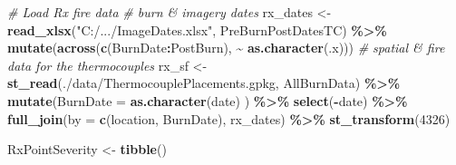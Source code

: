 \documentclass[
]{article}
\newenvironment{Shaded}{\begin{snugshade}}{\end{snugshade}}
\newcommand{\AttributeTok}[1]{\textcolor[rgb]{0.13,0.29,0.53}{#1}}
\newcommand{\CommentTok}[1]{\textcolor[rgb]{0.56,0.35,0.01}{\textit{#1}}}
\newcommand{\DecValTok}[1]{\textcolor[rgb]{0.00,0.00,0.81}{#1}}
\newcommand{\FunctionTok}[1]{\textcolor[rgb]{0.13,0.29,0.53}{\textbf{#1}}}
\newcommand{\NormalTok}[1]{#1}
\newcommand{\OtherTok}[1]{\textcolor[rgb]{0.56,0.35,0.01}{#1}}
\newcommand{\SpecialCharTok}[1]{\textcolor[rgb]{0.81,0.36,0.00}{\textbf{#1}}}
\newcommand{\StringTok}[1]{\textcolor[rgb]{0.31,0.60,0.02}{#1}}
\begin{document}
\begin{Shaded}
\begin{Highlighting}[]
\CommentTok{\# Load Rx fire data}
  \CommentTok{\# burn \& imagery dates }
\NormalTok{    rx\_dates }\OtherTok{\textless{}{-}}\FunctionTok{read\_xlsx}\NormalTok{(}\StringTok{"C:/.../ImageDates.xlsx"}\NormalTok{, }
                         \StringTok{\textquotesingle{}PreBurnPostDatesTC\textquotesingle{}}\NormalTok{) }\SpecialCharTok{\%\textgreater{}\%}
      \FunctionTok{mutate}\NormalTok{(}\FunctionTok{across}\NormalTok{(}\FunctionTok{c}\NormalTok{(BurnDate}\SpecialCharTok{:}\NormalTok{PostBurn), }\SpecialCharTok{\textasciitilde{}} \FunctionTok{as.character}\NormalTok{(.x)))}
  \CommentTok{\# spatial \& fire data for the thermocouples }
\NormalTok{    rx\_sf }\OtherTok{\textless{}{-}} \FunctionTok{st\_read}\NormalTok{(}\StringTok{\textquotesingle{}./data/ThermocouplePlacements.gpkg\textquotesingle{}}\NormalTok{, }
                     \StringTok{\textquotesingle{}AllBurnData\textquotesingle{}}\NormalTok{) }\SpecialCharTok{\%\textgreater{}\%}
              \FunctionTok{mutate}\NormalTok{(}\AttributeTok{BurnDate =} \FunctionTok{as.character}\NormalTok{(date) ) }\SpecialCharTok{\%\textgreater{}\%}
              \FunctionTok{select}\NormalTok{(}\SpecialCharTok{{-}}\NormalTok{date) }\SpecialCharTok{\%\textgreater{}\%}
              \FunctionTok{full\_join}\NormalTok{(}\AttributeTok{by =} \FunctionTok{c}\NormalTok{(}\StringTok{\textquotesingle{}location\textquotesingle{}}\NormalTok{, }\StringTok{\textquotesingle{}BurnDate\textquotesingle{}}\NormalTok{), }
\NormalTok{                        rx\_dates) }\SpecialCharTok{\%\textgreater{}\%}
              \FunctionTok{st\_transform}\NormalTok{(}\DecValTok{4326}\NormalTok{)}

\NormalTok{RxPointSeverity }\OtherTok{\textless{}{-}} \FunctionTok{tibble}\NormalTok{() }


\end{Highlighting}
\end{Shaded}
\end{document}
